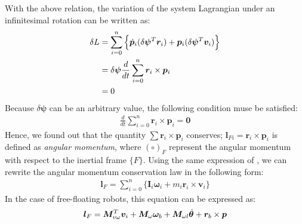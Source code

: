 With the above relation,
the variation of the system Lagrangian under an infinitesimal rotation can be written as:
%
\begin{align}
  \delta L &= \sum_{i=0}^{n}\Big\{\dot{\bm{p}}_{i}(\delta{\bm{\psi}}^{T}\bm{r}_{i}) +
  \bm{p}_{i}(\delta\bm{\psi}^{T}\bm{v}_{i})\Big\}\notag\\
  &= \delta\bm{\psi}\frac{d}{dt}\sum_{i=0}^{n}\bm{r}_{i}\times\bm{p}_{i}\notag\\
  &= 0
\end{align}
%
Because $\delta\bm{\psi}$ can be an arbitrary value,
the following condition muse be satisfied:
%
\begin{align}
  \frac{d}{dt}\sum_{i=0}^{n}\bm{r}_{i}\times\bm{p}_{i} = \bm{0}
\end{align}
%
Hence, we found out that the quantity $\sum\bm{r}_{i}\times\bm{p}_{i}$ conserves;
$\bm{l}_{Fi} = \bm{r}_{i}\times \bm{p}_{i}$ is defined as \textit{angular momentum},
where $(\circ)_{F}$ represent the angular momentum with respect to the inertial frame $\{F\}$.
Using the same expression of ,
we can rewrite the angular momentum conservation law in the following form:
%
\begin{align}
  \bm{l}_{F} = \sum_{i=0}^{n}\Big\{\bm{I}_{i}\bm{\omega}_{i} + m_{i}\bm{r}_{i}\times \bm{v}_{i}\Big\}
\end{align}
%
In the case of free-floating robots,
this equation can be expressed as:
%
\begin{align}
  \bm{l}_{F} = \bm{M}_{v\omega}^{T}\bm{v}_{i} + \bm{M}_{\omega}\bm{\omega}_{b} + \bm{M}_{\omega l}{\dot{\bm{\theta}}}
  + \bm{r}_{b}\times \bm{p}
\end{align}
%




